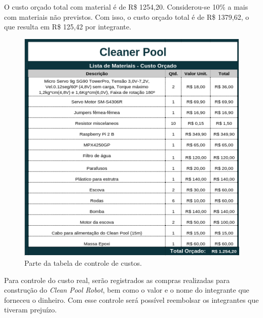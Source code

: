 \par O custo orçado total com material é de R\$ 1254,20. Considerou-se 10\% a mais com materiais não previstos. Com isso, o custo orçado total é de R\$ 1379,62, o que resulta em R\$ 125,42 por integrante.

\begin{figure}[h]
    \centering
    \includegraphics[width=\textwidth]{figures/custos.png}
    \caption{Parte da tabela de controle de custos.}
    \label{fig:schema-way-robot}
  \end{figure}
\FloatBarrier
\par Para controle do custo real, serão registrados as compras realizadas para construção do \textit{Clean Pool Robot}, bem como o valor e o nome do integrante que forneceu o dinheiro. Com esse controle será possível reembolsar os integrantes que tiveram prejuízo.


  